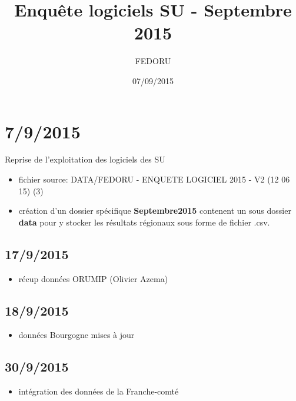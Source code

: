 \documentclass[]{article}
\title{Enquête logiciels SU - Septembre 2015}
\author{FEDORU}
\date{07/09/2015}
\begin{document}
\maketitle


{
\hypersetup{linkcolor=black}
\setcounter{tocdepth}{2}
\tableofcontents
}
\section{7/9/2015}\label{section}

Reprise de l'exploitation des logiciels des SU

\begin{itemize}
\itemsep1pt\parskip0pt
\item
  fichier source: DATA/FEDORU - ENQUETE LOGICIEL 2015 - V2 (12 06 15)
  (3)
\item
  création d'un dossier spécifique \textbf{Septembre2015} contenent un
  sous dossier \textbf{data} pour y stocker les résultats régionaux sous
  forme de fichier .csv.
\end{itemize}

\subsection{17/9/2015}\label{section-1}

\begin{itemize}
\itemsep1pt\parskip0pt
\item
  récup données ORUMIP (Olivier Azema)
\end{itemize}

\subsection{18/9/2015}\label{section-2}

\begin{itemize}
\itemsep1pt\parskip0pt
\item
  données Bourgogne mises à jour
\end{itemize}

\subsection{30/9/2015}\label{section-3}

\begin{itemize}
\itemsep1pt\parskip0pt
\item
  intégration des données de la Franche-comté
\end{itemize}
\end{document}
